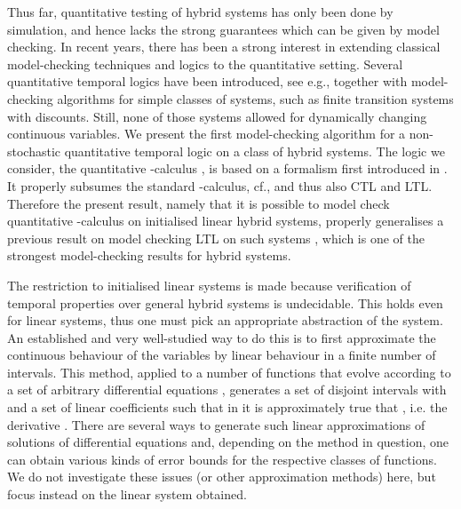 \documentclass[fleqn,envcountsame]{LMCS}
\newcommand{\cf}{cf.\xspace}
\newcommand{\eg}{e.g.\xspace}
\newcommand{\ie}{i.e.\xspace}
\begin{document}
Thus far, quantitative testing of hybrid systems has only been done
by simulation, and hence lacks the strong guarantees which can be given
by model checking. In recent years, there has been a strong interest
in extending classical model-checking techniques and logics to the quantitative
setting. Several quantitative temporal logics have been introduced,
see \eg  \cite{Alfaro03,AlfaroFS04,AlfaroM04,FGK10,seidl07,Hugo07,McIver},
together with model-checking algorithms for simple classes of systems,
such as finite transition systems with discounts. Still, none of those
systems allowed for dynamically changing continuous variables.
We present the first model-checking algorithm for a non-stochastic quantitative
temporal logic on a class of hybrid systems.
The logic we consider, the quantitative -calculus \cite{FGK10},
is based on a formalism first introduced in \cite{AlfaroFS04}.
It properly subsumes the standard -calculus, \cf \cite{BradfieldS01}, and
thus also CTL and LTL.
Therefore the present result, namely that it is possible to
model check quantitative -calculus on initialised linear
hybrid systems, properly generalises a previous result on
model checking LTL on such systems \cite{HHM99,HKPV95}, which is
one of the strongest model-checking results for hybrid systems.

The restriction to initialised linear systems is made because verification
of temporal properties over general hybrid systems is undecidable. This
holds even for linear systems, thus one must pick an appropriate abstraction
of the system. An established and very well-studied way to do this is to
first approximate the continuous behaviour of the variables by linear
behaviour in a finite number of intervals.
This method, applied to a number of functions  that
evolve according to a set of arbitrary differential equations
, generates a set of disjoint intervals
 with  and
a set of linear coefficients  such that in  it is
approximately true that , \ie the
derivative . There are several
ways to generate such linear approximations of solutions of differential
equations and, depending on the method in question, one can obtain various
kinds of error bounds for the respective classes of functions.
We do not investigate these issues (or other approximation methods) here,
but focus instead on the linear system obtained. 
\end{document}
